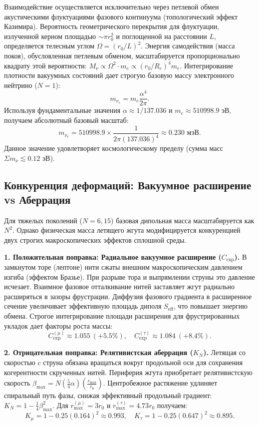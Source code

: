 \documentclass[11pt,a4paper]{article}
\begin{document}
Взаимодействие осуществляется исключительно через петлевой обмен акустическими флуктуациями фазового континуума (топологический эффект Казимира). Вероятность геометрического перекрытия для флуктуации, излученной керном площадью $\sim \pi r_0^2$ и поглощенной на расстоянии $L$, определяется телесным углом $\Omega = (r_0/L)^2$. Энергия самодействия (масса покоя), обусловленная петлевым обменом, масштабируется пропорционально квадрату этой вероятности: $M_\nu \propto \Omega^2 \cdot m_e \propto (r_0/R_e)^4 m_e$.
Интегрирование плотности вакуумных состояний дает строгую базовую массу электронного нейтрино ($N=1$):
\begin{equation}
	m_{\nu_e} = m_e \frac{\alpha^4}{2\pi}.
\end{equation}
Используя фундаментальные значения $\alpha \approx 1/137.036$ и $m_e \approx 510998.9$ эВ, получаем абсолютный базовый масштаб:
\begin{equation}
	m_{\nu_e} = 510998.9 \times \frac{1}{2\pi (137.036)^4} \approx \mathbf{0.230 \text{ мэВ}}.
\end{equation}
Данное значение удовлетворяет космологическому пределу (сумма масс $\Sigma m_\nu \lesssim 0.12$ эВ).

\subsection{Конкуренция деформаций: Вакуумное расширение vs Аберрация}
Для тяжелых поколений ($N=6, 15$) базовая дипольная масса масштабируется как $N^2$. Однако физическая масса летящего жгута модифицируется конкуренцией двух строгих макроскопических эффектов сплошной среды.

\textbf{1. Положительная поправка: Радиальное вакуумное расширение ($C_{\text{exp}}$).}
В замкнутом торе (лептоне) нити сжаты внешним макроскопическим давлением изгиба (эффектом Бразье). При разрыве тора и выпрямлении струны это давление исчезает. Взаимное фазовое отталкивание нитей заставляет жгут радиально расширяться в зазоры фрустрации. Диффузия фазового градиента в расширенное сечение увеличивает эффективную площадь диполя $S_{\text{eff}}$, что повышает энергию обмена. Строгое интегрирование площади расширения для фрустрированных укладок дает факторы роста массы:
\begin{equation}
	C_{\text{exp}}^{(\mu)} \approx 1.055 \ (+5.5\%), \quad C_{\text{exp}}^{(\tau)} \approx 1.084 \ (+8.4\%).
\end{equation}

\textbf{2. Отрицательная поправка: Релятивистская аберрация ($K_N$).}
Летящая со скоростью $c$ струна обязана вращаться вокруг продольной оси для сохранения когерентности скрученных нитей. Периферия жгута приобретает релятивистскую скорость $\beta_{\text{max}} = N (\frac{5}{4}\alpha) (\frac{r_{\text{max}}}{r_0})$. Центробежное растяжение удлиняет спиральный путь фазы, снижая эффективный продольный градиент: $K_N = 1 - \frac{1}{4}\beta_{\text{max}}^2$.
Для $r_{\text{max}}^{(\mu)} = 3r_0$ и $r_{\text{max}}^{(\tau)} = 4.73r_0$ получаем:
\begin{equation}
	K_\mu = 1 - 0.25(0.164)^2 \approx 0.993, \quad K_\tau = 1 - 0.25(0.647)^2 \approx 0.895.
\end{equation}
\end{document}
